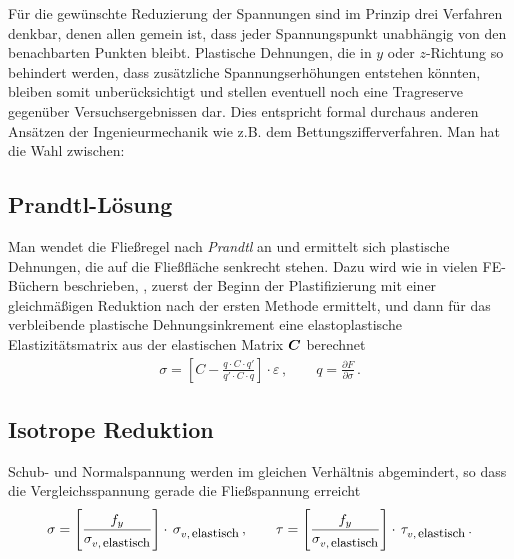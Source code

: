 F\"{u}r die gew\"{u}nschte Reduzierung der Spannungen sind im Prinzip drei Verfahren denkbar, denen allen gemein ist, dass jeder Spannungspunkt unabh\"{a}ngig von den benachbarten Punkten bleibt. Plastische Dehnungen, die in $y$ oder $z$-Richtung so behindert werden, dass zus\"{a}tzliche Spannungserh\"{o}hungen entstehen k\"{o}nnten, bleiben somit unber\"{u}cksichtigt und stellen eventuell noch eine Tragreserve gegen\"{u}ber Versuchsergebnissen dar. Dies entspricht formal durchaus anderen Ans\"{a}tzen der Ingenieurmechanik wie z.B. dem Bettungszifferverfahren. Man hat die Wahl zwischen:
{\textcolor{sectionTitleBlue}{\subsection{Prandtl-L\"{o}sung}}}
Man wendet die Flie{\ss}regel nach {\em Prandtl\/} an und ermittelt sich plastische Dehnungen, die auf die Flie{\ss}fl\"{a}che senkrecht stehen. Dazu wird wie in vielen FE-B\"{u}chern beschrieben, \cite{Kiener1}, zuerst der Beginn der Plastifizierung mit einer gleichm\"{a}{\ss}igen Reduktion nach der ersten Methode ermittelt, und dann f\"{u}r das verbleibende plastische Dehnungsinkrement eine elastoplastische Elastizit\"{a}tsmatrix aus der elastischen Matrix $\mbox{\boldmath $C$}$ berechnet
\begin{align}
\sigma = \left[C - \frac{q\cdot C\cdot q'}{q'\cdot C \cdot q}\right] \cdot \varepsilon\,,
\qquad q = \frac{\partial F}{\partial \sigma}\,.
\end{align}
{\textcolor{sectionTitleBlue}{\subsection{Isotrope Reduktion}}}
Schub- und Normalspannung werden im gleichen Verh\"{a}ltnis abgemindert, so dass die Vergleichsspannung gerade die Flie{\ss}spannung erreicht
\begin{align}
\sigma = \left[\frac{f_y}{\sigma_{v,\,\mbox{\small elastisch}}} \right]\cdot
\,\sigma_{v,\,\mbox{\small elastisch}}\,, \qquad \tau =
\left[\frac{f_y}{\sigma_{v,\,\mbox{\small elastisch}}} \right]\cdot
\,\tau_{v,\,\mbox{\small elastisch}}\,.
\end{align}
